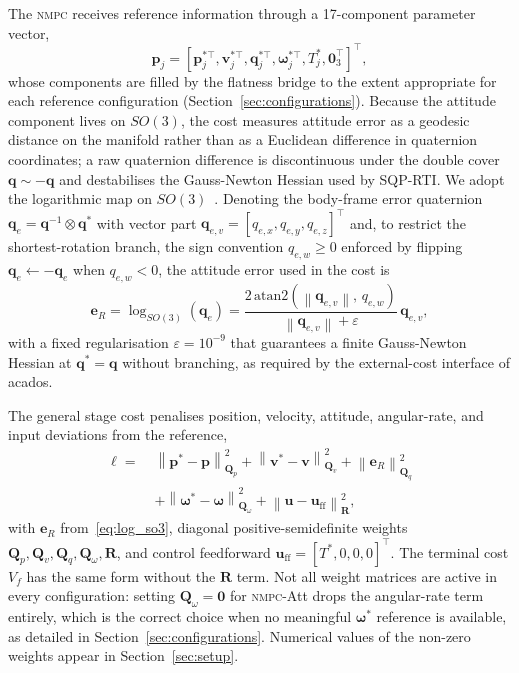 \documentclass{ieeeaccess}
\newcommand{\norm}[1]{\left\| #1 \right\|}
\newcommand{\vect}[1]{\bm{#1}}
\newcommand{\mat}[1]{\mathbf{#1}}
\newcommand{\nmpc}{\textsc{nmpc}}
\begin{document}
The \nmpc{} receives reference information through a 17-component
parameter vector,
\begin{equation}
  \vect{p}_j=
  [\vect{p}_j^{*\top},\vect{v}_j^{*\top},
   \vect{q}_j^{*\top},\vect{\omega}_j^{*\top},
   T_j^*,\vect{0}_3^\top]^\top,
  \label{eq:param_vec}
\end{equation}
whose components are filled by the flatness bridge to the extent
appropriate for each reference configuration
(Section~\ref{sec:configurations}).
Because the attitude component lives on $SO(3)$, the cost measures
attitude error as a geodesic distance on the manifold rather than as a
Euclidean difference in quaternion coordinates; a raw quaternion
difference is discontinuous under the double cover $\vect{q}\sim-\vect{q}$
and destabilises the Gauss-Newton Hessian used by SQP-RTI.
We adopt the logarithmic map on $SO(3)$~\cite{lee2010geometric}.
Denoting the body-frame error quaternion
$\vect{q}_e=\vect{q}^{-1}\otimes\vect{q}^*$ with vector part
$\vect{q}_{e,v}=[q_{e,x},q_{e,y},q_{e,z}]^\top$ and, to restrict the
shortest-rotation branch, the sign convention $q_{e,w}\geq 0$
enforced by flipping $\vect{q}_e\leftarrow-\vect{q}_e$ when
$q_{e,w}<0$, the attitude error used in the cost is
\begin{equation}
  \vect{e}_R=\log_{SO(3)}(\vect{q}_e)
   =\frac{2\,\mathrm{atan2}(\norm{\vect{q}_{e,v}},\,q_{e,w})}
         {\norm{\vect{q}_{e,v}}+\varepsilon}\,\vect{q}_{e,v},
  \label{eq:log_so3}
\end{equation}
with a fixed regularisation $\varepsilon=10^{-9}$ that guarantees a
finite Gauss-Newton Hessian at $\vect{q}^*=\vect{q}$ without branching,
as required by the external-cost interface of acados.

The general stage cost penalises position, velocity, attitude,
angular-rate, and input deviations from the reference,
\begin{align}
  \ell =\;
    &\norm{\vect{p}^*-\vect{p}}_{\mat{Q}_p}^2
    + \norm{\vect{v}^*-\vect{v}}_{\mat{Q}_v}^2
    + \norm{\vect{e}_R}_{\mat{Q}_q}^2 \nonumber\\
    &+\norm{\vect{\omega}^*-\vect{\omega}}_{\mat{Q}_\omega}^2
    + \norm{\vect{u}-\vect{u}_\text{ff}}_{\mat{R}}^2,
  \label{eq:stage_cost}
\end{align}
with $\vect{e}_R$ from~\eqref{eq:log_so3}, diagonal positive-semidefinite
weights $\mat{Q}_p,\mat{Q}_v,\mat{Q}_q,\mat{Q}_\omega,\mat{R}$, and
control feedforward $\vect{u}_\text{ff}=[T^*,0,0,0]^\top$.
The terminal cost $V_f$ has the same form without the $\mat{R}$ term.
Not all weight matrices are active in every configuration: setting
$\mat{Q}_\omega=\mat{0}$ for \nmpc{}-Att drops the angular-rate term
entirely, which is the correct choice when no meaningful $\vect{\omega}^*$
reference is available, as detailed in Section~\ref{sec:configurations}.
Numerical values of the non-zero weights appear in
Section~\ref{sec:setup}.
\end{document}
